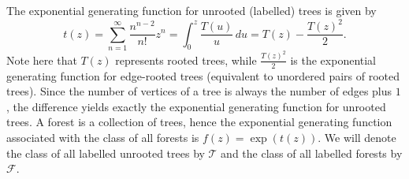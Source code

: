 \documentclass[a4paper]{article}
\newcommand{\T}{\mathcal{T}}
\newcommand{\F}{\mathcal{F}}
\theoremstyle{remark}
\begin{document}

The exponential generating function for unrooted (labelled) trees is given by
\begin{equation}\label{eq:unrooted_gf}
t(z) = \sum_{n=1}^{\infty} \frac{n^{n-2}}{n!} z^n = \int_0^z \frac{T(u)}{u}\,du = T(z) - \frac{T(z)^2}{2}.
\end{equation}
Note here that $T(z)$ represents rooted trees, while $\frac{T(z)^2}{2}$ is the exponential generating function for edge-rooted trees (equivalent to unordered pairs of rooted trees). Since the number of vertices of a tree is always the number of edges plus $1$, the difference yields exactly the exponential generating function for unrooted trees. A forest is a collection of trees, hence the exponential generating function associated with the class of all forests is $f(z) = \exp(t(z))$. We will denote the class of all labelled unrooted trees by $\T$ and the class of all labelled forests by $\F$.
\end{document}
